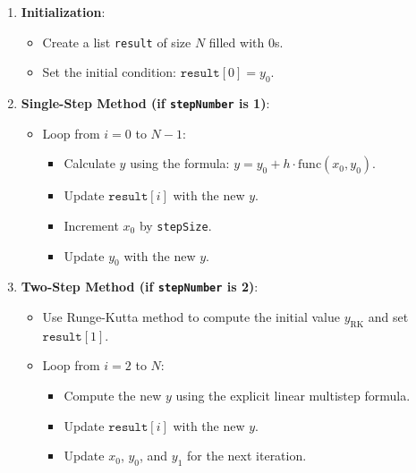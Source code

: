     \begin{enumerate}
        \item \textbf{Initialization}:
        \begin{itemize}
            \item Create a list \texttt{result} of size $N$ filled with 0s.
            \item Set the initial condition: $\texttt{result}[0] = y_0$.
        \end{itemize}
        
        \item \textbf{Single-Step Method (if \texttt{stepNumber} is 1)}:
        \begin{itemize}
            \item Loop from $i = 0$ to $N-1$:
            \begin{itemize}
                \item Calculate $y$ using the formula: $y = y_0 + h \cdot \text{func}(x_0, y_0)$.
                \item Update $\texttt{result}[i]$ with the new $y$.
                \item Increment $x_0$ by \texttt{stepSize}.
                \item Update $y_0$ with the new $y$.
            \end{itemize}
        \end{itemize}
        
        \item \textbf{Two-Step Method (if \texttt{stepNumber} is 2)}:
        \begin{itemize}
            \item Use Runge-Kutta method to compute the initial value $y_{\text{RK}}$ and set $\texttt{result}[1]$.
            \item Loop from $i = 2$ to $N$:
            \begin{itemize}
                \item Compute the new $y$ using the explicit linear multistep formula.
                \item Update $\texttt{result}[i]$ with the new $y$.
                \item Update $x_0$, $y_0$, and $y_1$ for the next iteration.
            \end{itemize}
        \end{itemize}
        

\end{enumerate}
